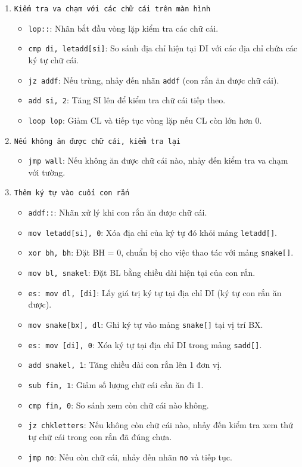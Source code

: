 \documentclass[12pt]{article}
\begin{document}
\begin{enumerate}[label=\textbf{\arabic*.}]
    \item \texttt{Kiểm tra va chạm với các chữ cái trên màn hình}
    \begin{itemize}
        \item \texttt{lop::}: Nhãn bắt đầu vòng lặp kiểm tra các chữ cái.
        \item \texttt{cmp di, letadd[si]}: So sánh địa chỉ hiện tại DI với các địa chỉ chứa các ký tự chữ cái.
        \item \texttt{jz addf}: Nếu trùng, nhảy đến nhãn \texttt{addf} (con rắn ăn được chữ cái).
        \item \texttt{add si, 2}: Tăng SI lên để kiểm tra chữ cái tiếp theo.
        \item \texttt{loop lop}: Giảm CL và tiếp tục vòng lặp nếu CL còn lớn hơn 0.
    \end{itemize}

    \item \texttt{Nếu không ăn được chữ cái, kiểm tra lại}
    \begin{itemize}
        \item \texttt{jmp wall}: Nếu không ăn được chữ cái nào, nhảy đến kiểm tra va chạm với tường.
    \end{itemize}

    \item \texttt{Thêm ký tự vào cuối con rắn}
    \begin{itemize}
        \item \texttt{addf::}: Nhãn xử lý khi con rắn ăn được chữ cái.
        \item \texttt{mov letadd[si], 0}: Xóa địa chỉ của ký tự đó khỏi mảng \texttt{letadd[]}.
        \item \texttt{xor bh, bh}: Đặt BH = 0, chuẩn bị cho việc thao tác với mảng \texttt{snake[]}.
        \item \texttt{mov bl, snakel}: Đặt BL bằng chiều dài hiện tại của con rắn.
        \item \texttt{es: mov dl, [di]}: Lấy giá trị ký tự tại địa chỉ DI (ký tự con rắn ăn được).
        \item \texttt{mov snake[bx], dl}: Ghi ký tự vào mảng \texttt{snake[]} tại vị trí BX.
        \item \texttt{es: mov [di], 0}: Xóa ký tự tại địa chỉ DI trong mảng \texttt{sadd[]}.
        \item \texttt{add snakel, 1}: Tăng chiều dài con rắn lên 1 đơn vị.
        \item \texttt{sub fin, 1}: Giảm số lượng chữ cái cần ăn đi 1.
        \item \texttt{cmp fin, 0}: So sánh xem còn chữ cái nào không.
        \item \texttt{jz chkletters}: Nếu không còn chữ cái nào, nhảy đến kiểm tra xem thứ tự chữ cái trong con rắn đã đúng chưa.
        \item \texttt{jmp no}: Nếu còn chữ cái, nhảy đến nhãn \texttt{no} và tiếp tục.
    \end{itemize}


\end{enumerate}
\end{document}
